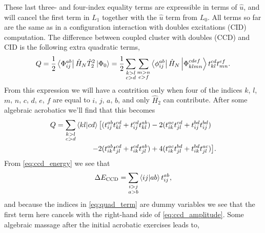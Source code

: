 These last three- and four-index equality terms are expressible in terms of $\hat{u}$,
and will cancel the first term in $L_1$ together with the $\hat{u}$ term from $L_0$.
All terms so far are the same as in a configuration interaction with doubles excitations
(CID) computation. The difference between coupled cluster with doubles (CCD) and
CID is the following extra quadratic terms,
\begin{equation}
    Q = \frac{1}{2}\bra{\Phi^{ab}_{ij}} \hat{H}_N \hat{T}_2^2\ket{\Phi_0}
        = \frac{1}{2} \sum_{\substack{k>l \\ c>d}} \sum_{\substack{m>n \\ e>f}}
            \bra{\phi^{ab}_{ij}} \hat{H}_N \ket{\Phi^{cdef}_{klmn}}t^{cd}_{kl}t^{ef}_{mn}.
\end{equation}
From this expression we will have a contrition only when four of the indices $k$, $l$,
$m$, $n$, $c$, $d$, $e$, $f$ are equal to $i$, $j$, $a$, $b$, and only $\hat{H}_2$
can contribute. After some algebraic acrobatics we'll find that this becomes
\begin{equation}
    \label{eq:quad_term}
    \begin{aligned}
        Q = \sum_{\substack{k>l \\ c>d}} \bra{kl} \ket{cd}\big[
                &(t^{ab}_{ij}t^{cd}_{kl} + t^{cd}_{ij}t^{ab}_{kl}) 
            -2   (t^{ac}_{ik}t^{cd}_{jl} + t^{bd}_{ij}t^{bd}_{ij}) \\
            -2  &(t^{ab}_{ik}t^{cd}_{jl} + t^{cd}_{ik}t^{ab}_{jl}) 
            +4   (t^{ac}_{ik}t^{bd}_{jl} + t^{bd}_{ik}t^{ac}_{jl})
            \big].
    \end{aligned}
\end{equation}
From \autoref{eq:ccd_energy} we see that
\begin{equation}
    \label{eq:ccd_energy2}
    \Delta E_{\text{CCD}} = \sum_{\substack{i>j \\ a>b}} \bra{ij} \ket{ab} t^{ab}_{ij},
\end{equation}
and because the indices in \autoref{eq:quad_term} are dummy variables we see that
the first term here cancels with the right-hand side of \autoref{eq:ccd_amplitude}.
Some algebraic massage after the initial acrobatic exercises leads to,
